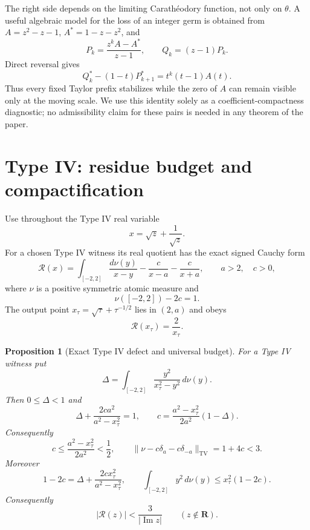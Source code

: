 \documentclass[11pt,reqno]{amsart}
\newtheorem{proposition}[theorem]{Proposition}
\theoremstyle{definition}
\theoremstyle{remark}
\DeclareMathOperator{\TV}{TV}
\newcommand{\R}{\mathbf R}
\begin{document}
The right side depends on the limiting Carath\'eodory function, not only on
$\theta$.  A useful algebraic model for the loss of an integer germ is
obtained from $A=z^2-z-1$, $A^*=1-z-z^2$, and
\[
 P_k=\frac{z^kA-A^*}{z-1},\qquad Q_k=(z-1)P_k.
\]
Direct reversal gives
\[
 Q_k^*-(1-t)P_{k+1}^*=t^k(t-1)A(t).
\]
Thus every fixed Taylor prefix stabilizes while the zero of $A$ can remain
visible only at the moving scale.  We use this identity solely as a
coefficient-compactness diagnostic; no admissibility claim for these pairs is
needed in any theorem of the paper.

\section{Type IV: residue budget and compactification}

Use throughout the Type IV real variable
\begin{equation}\label{eq:xnormalization}
 x=\sqrt z+\frac1{\sqrt z}.
\end{equation}
For a chosen Type IV witness its real quotient has the exact signed Cauchy
form
\begin{equation}\label{eq:typeIVreal}
 \mathcal R(x)=\int_{[-2,2]}\frac{d\nu(y)}{x-y}
 -\frac c{x-a}-\frac c{x+a},\qquad a>2,\quad c>0,
\end{equation}
where $\nu$ is a positive symmetric atomic measure and
\begin{equation}\label{eq:mass}
 \nu([-2,2])-2c=1.
\end{equation}
The output point $x_\tau=\sqrt\tau+\tau^{-1/2}$ lies in $(2,a)$ and obeys
\begin{equation}\label{eq:typeIVoutput}
 \mathcal R(x_\tau)=\frac2{x_\tau}.
\end{equation}

\begin{proposition}[Exact Type IV defect and universal budget]
\label{prop:IVbudget}
For a Type IV witness put
\[
 \Delta=\int_{[-2,2]}\frac{y^2}{x_\tau^2-y^2}\,d\nu(y).
\]
Then $0\le\Delta<1$ and
\begin{equation}\label{eq:IVdefect}
 \Delta+\frac{2ca^2}{a^2-x_\tau^2}=1,
 \qquad
 c=\frac{a^2-x_\tau^2}{2a^2}(1-\Delta).
\end{equation}
Consequently
\begin{equation}\label{eq:IVbudget}
 c\le\frac{a^2-x_\tau^2}{2a^2}<\frac12,\qquad
 \|\nu-c\delta_a-c\delta_{-a}\|_{\TV}=1+4c<3.
\end{equation}
Moreover
\begin{equation}\label{eq:IVmoment}
 1-2c=\Delta+\frac{2cx_\tau^2}{a^2-x_\tau^2},
 \qquad
 \int_{[-2,2]}y^2\,d\nu(y)\le x_\tau^2(1-2c).
\end{equation}
Consequently
\begin{equation}\label{eq:normalbound}
 |\mathcal R(z)|<\frac3{|\operatorname{Im}z|}\qquad(z\notin\R).
\end{equation}
\end{proposition}
\end{document}
